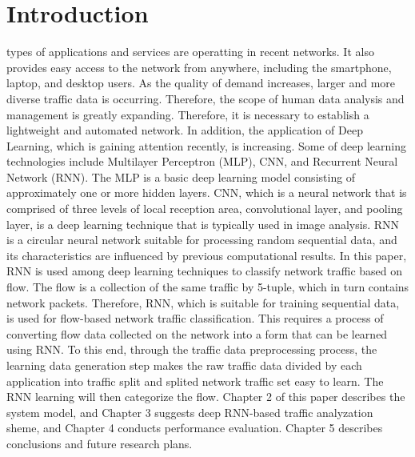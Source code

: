 \documentclass[10pt, twoside, jounal]{IEEEtran}
\begin{document}
\IEEEpeerreviewmaketitle


\section{Introduction}

 types of applications and services are operatting in recent networks. It also provides easy access to the network from anywhere, including the smartphone, laptop, and desktop users. As the quality of demand increases, larger and more diverse traffic data is occurring.
Therefore, the scope of human data analysis and management is greatly expanding\cite{Park2009}. Therefore, it is necessary to establish a lightweight and automated network\cite{Risso2008}. In addition, the application of Deep Learning, which is gaining attention recently, is increasing.
Some of deep learning technologies include Multilayer Perceptron (MLP), CNN, and Recurrent Neural Network (RNN).
The MLP is a basic deep learning model consisting of approximately one or more hidden layers. CNN, which is a neural network that is comprised of three levels of local reception area, convolutional layer, and pooling layer, is a deep learning technique that is typically used in image analysis. RNN is a circular neural network suitable for processing random sequential data, and its characteristics are influenced by previous computational results. In this paper, RNN is used among deep learning techniques to classify network traffic based on flow.
The flow is a collection of the same traffic by 5-tuple, which in turn contains network packets. Therefore, RNN, which is suitable for training sequential data, is used for flow-based network traffic classification.
This requires a process of converting flow data collected on the network into a form that can be learned using RNN.
To this end, through the traffic data preprocessing process, the learning data generation step makes the raw traffic data divided by each application into traffic split and splited network traffic set easy to learn. The RNN learning will then categorize the flow.
Chapter 2 of this paper describes the system model, and Chapter 3 suggests deep RNN-based traffic analyzation sheme, and Chapter 4 conducts performance evaluation. Chapter 5 describes conclusions and future research plans.
\end{document}
